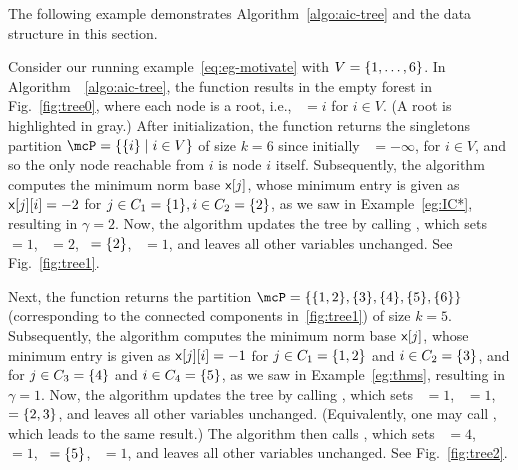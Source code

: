 The following example demonstrates Algorithm~\ref{algo:aic-tree} and the data structure in this section.
\begin{example}
	\label{eg:data}
	
	Consider our running example~\eqref{eq:eg-motivate} with $V = \{1,\ldots,6\}$.
	In Algorithm~~\ref{algo:aic-tree}, the function \initialize{} results in the empty forest in Fig.~\ref{fig:tree0}, where each node is a root, i.e., ~$ = i$ for
	$i\in V$. (A root is highlighted in gray.)
	After initialization, the function
	\getPartition{$-\infty$} returns the singletons partition $\mcP = \Set{\Set{i}\mid i \in V}$ of size
	$k = 6$ since initially ~$ = -\infty$, for $i\in V$, and so the only node reachable
	from $i$ is node $i$ itself. Subsequently, the algorithm computes the minimum norm base
	$\DataSty{x}[j]$, whose minimum entry is given as
	$\DataSty{x}[j][i] = -2$ for $j \in C_1 = \{1\}, i\in C_2 = \{2\}$,
	as we saw in Example~\ref{eg:IC*}, resulting in $\gamma = 2$. Now, the algorithm updates the tree by calling
	, which sets ~$ = 1$, ~$ = 2$, ~$ = \{2\}$,
	~$=1$, and leaves all other variables unchanged. See Fig.~\ref{fig:tree1}.

	Next, the function
	\getPartition{$-\infty$} returns the partition $\mcP = \Set{\Set{1,2}, \Set{3},
	\Set{4}, \Set{5}, \Set{6}}$ (corresponding to the connected components in~\ref{fig:tree1}) of size
	$k = 5$.
	Subsequently, the algorithm computes the minimum norm base
	$\DataSty{x}[j]$, whose minimum entry is given as
	$\DataSty{x}[j][i] = -1$ for $j \in C_1 = \{1,2\}$ and $i\in C_2 = \{3\}$,
	and for $j \in C_3 = \{4\}$ and $i\in C_4 = \{5\}$,
	as we saw in Example~\ref{eg:thms}, resulting in $\gamma = 1$. Now, the algorithm updates the tree by calling
	, which sets ~$ = 1$, ~$ = 1$, ~$ = \{2,3\}$,
	and leaves all other variables unchanged. (Equivalently, one may call
	, which leads to the same result.)
	The algorithm then calls , which sets ~$ = 4$, ~$ = 1$,
	~$ = \{5\}$, ~$ = 1$, 
	and leaves all other variables unchanged.
	See Fig.~\ref{fig:tree2}. 


\end{example}
